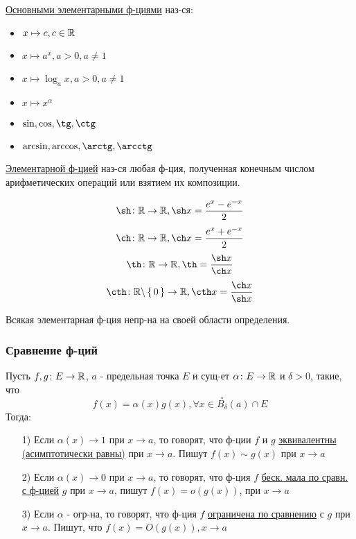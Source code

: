 \begin{definition}
\underline{Основными элементарными ф-циями} наз-ся:
\begin{itemize}
  \item $x \mapsto c, c \in \mathbb{R}$
  \item $x \mapsto a^{x}, a > 0, a \neq 1$
  \item $x \mapsto \log_a x, a > 0, a \neq 1$
  \item $x \mapsto x^{\alpha}$
  \item $\sin, \cos, \tg, \ctg$
  \item $\arcsin, \arccos, \arctg, \arcctg$
\end{itemize}
\end{definition}
\begin{definition}
\underline{Элементарной ф-цией} наз-ся любая ф-ция, полученная конечным числом арифметических операций или взятием их композиции.
\end{definition}
\begin{example}
\[
\sh \colon \R \rightarrow \R, \sh x = \frac{e^{x} - e^{-x}}{2}
\]
\[
\ch \colon \R \rightarrow \R, \ch x = \frac{e^{x} + e^{-x}}{2}
\]
\[
  \th \colon \R \rightarrow \R, \th = \frac{\sh x}{\ch x}
\]
\[
\cth \colon \R \backslash \set{0} \rightarrow \R, \cth x = \frac{\ch x}{\sh x}
\]
\end{example}
\begin{theorem}
Всякая элементарная ф-ция непр-на на своей области определения.
\end{theorem}
\subsubsection{Сравнение ф-ций}
\begin{definition}
Пусть $f, g \colon E \rightarrow \mathbb{R}$, $a$ - предельная точка $E$ и сущ-ет $\alpha \colon E \rightarrow \mathbb{R}$ и $\delta > 0$, такие, что
\[
  f(x) = \alpha(x)g(x), \forall x \in \overset{\circ}{B_{\delta}}(a) \cap E
\]
Тогда:
\begin{itemize}
\item [1) ] Если $\alpha(x) \rightarrow 1$ при $x \rightarrow a$, то говорят, что ф-ции $f$ и $g$ \underline{эквивалентны} \underline{(асимптотически равны)} при $x \rightarrow a$. Пишут $f(x) \sim g(x)$ при $x \rightarrow a$
  \item [2) ]  Если $\alpha(x) \rightarrow 0$ при $x \rightarrow a$, то говорят, что ф-ция $f$ \underline{беск. мала по сравн. с ф-цией} $g$ при $x \rightarrow a$, пишут $f(x) = o(g(x))$, при $x \rightarrow a$
  \item [3) ] Если $\alpha$ - огр-на, то говорят, что ф-ция $f$ \underline{ограничена по сравнению} с $g$ при $x \rightarrow a$. Пишут, что $f(x) = O(g(x)), x \rightarrow a$
\end{itemize}
\end{definition}
